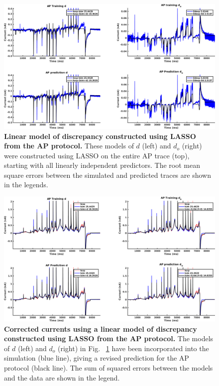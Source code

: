\documentclass[11pt,a4paper,oneside]{article}
\begin{document}
\clearpage

\begin{figure}[t]
\begin{center}
\includegraphics[scale=0.42]{Figures/LASSO_AP_AP_full_discrepancy.png}
\caption{\textbf{Linear model of discrepancy constructed using LASSO from the AP protocol.} These models of $d$ (left) and $d_o$ (right) were constructed using LASSO on the entire AP trace (top), starting with all linearly independent predictors. The root mean square errors between the simulated and predicted traces are shown in the legends. } 
\label{Fig_LASSO_AP_AP_full_discrepancy}
\end{center}
\end{figure}

\begin{figure}[hb]
\begin{center}
\includegraphics[scale=0.42]{Figures/LASSO_AP_AP_full_currents.png}
\caption{\textbf{Corrected currents using a linear model of discrepancy constructed using LASSO from the AP protocol.} The models of $d$ (left) and $d_o$ (right) in Fig. ~\ref{Fig_LASSO_AP_AP_full_discrepancy} have been incorporated into the simulation (blue line), giving a revised prediction for the AP protocol (black line). The sum of squared errors between the models and the data are shown in the legend.}
\label{Fig_LASSO_AP_AP_full_currents}
\end{center}
\end{figure}
\end{document}
